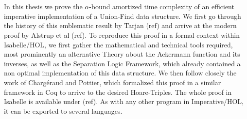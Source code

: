 \chapter{\abstractname}

In this thesis we prove the $\alpha$-bound amortized time complexity of an efficient imperative implementation of a Union-Find data structure. We first go through the history of this emblematic result by Tarjan (ref) and arrive at the modern proof by Alstrup et al (ref). 
To reproduce this proof in a formal context within Isabelle/HOL, we first gather the mathematical and technical tools required, most prominently an alternative Theory about the Ackermann function and its inverses, as well as the Separation Logic Framework, which already contained a non optimal implementation of this data structure.
We then follow closely the work of Chargéraud and Pottier, which formalized this proof in a similar framework in Coq to arrive to the desired Hoare-Triples. The whole proof in Isabelle is available under (ref). As with any other program in Imperative/HOL, it can be exported to several languages.

